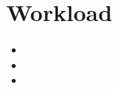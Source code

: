 \section{Workload} 
\label{sec:workload}

\lipsum[1]
\begin{itemize}
  \item \lipsum[1]
  \item \lipsum[1]
  \item \lipsum[1]
\end{itemize}
\lipsum[1]
